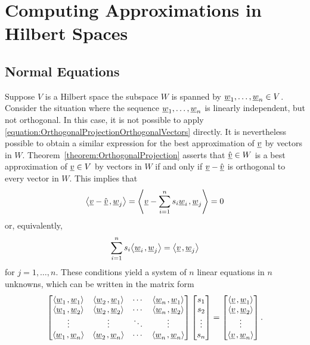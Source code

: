 \section{Computing Approximations in Hilbert Spaces}

\subsection{Normal Equations}

Suppose $V$ is a Hilbert space the subspace $W$ is spanned by $\underline{w}_1, \ldots, \underline{w}_n \in V$.
Consider the situation where the sequence $\underline{w}_1, \ldots, \underline{w}_n$ is linearly independent, but not orthogonal.
In this case, it is not possible to apply \eqref{equation:OrthogonalProjectionOrthogonalVectors} directly.
It is nevertheless possible to obtain a similar expression for the best approximation of $\underline{v}$ by vectors in $W$.
Theorem~\ref{theorem:OrthogonalProjection} asserts that $\hat{\underline{v}} \in W$ is a best approximation of $\underline{v} \in V$ by vectors in $W$ if and only if $\underline{v} - \hat{\underline{v}}$ is orthogonal to every vector in $W$.
This implies that
\begin{equation*}
{\left\langle  \underline{v} - \hat{\underline{v}}  \mskip2mu ,  \underline{w}_j  \right\rangle}
= {\left\langle  \underline{v} - \sum_{i=1}^n s_i \underline{w}_i  \mskip2mu ,  \underline{w}_j  \right\rangle}
= 0
\end{equation*}
or, equivalently,
\begin{equation*}
\sum_{i=1}^n s_i {\left\langle  \underline{w}_i  \mskip2mu ,  \underline{w}_j  \right\rangle}
= {\left\langle  \underline{v}  \mskip2mu ,  \underline{w}_j  \right\rangle}
\end{equation*}
for $j = 1, \ldots, n$.
These conditions yield a system of $n$ linear equations in $n$ unknowns, which can be written in the matrix form
\begin{equation*}
\begin{bmatrix}
{\left\langle  \underline{w}_1  \mskip2mu ,  \underline{w}_1  \right\rangle}
& {\left\langle  \underline{w}_2  \mskip2mu ,  \underline{w}_1  \right\rangle} & \cdots
& {\left\langle  \underline{w}_n  \mskip2mu ,  \underline{w}_1  \right\rangle} \\
{\left\langle  \underline{w}_1  \mskip2mu ,  \underline{w}_2  \right\rangle}
& {\left\langle  \underline{w}_2  \mskip2mu ,  \underline{w}_2  \right\rangle} & \cdots
& {\left\langle  \underline{w}_n  \mskip2mu ,  \underline{w}_2  \right\rangle} \\
\vdots & \vdots & \ddots & \vdots \\
{\left\langle  \underline{w}_1  \mskip2mu ,  \underline{w}_n  \right\rangle}
& {\left\langle  \underline{w}_2  \mskip2mu ,  \underline{w}_n  \right\rangle} & \cdots
& {\left\langle  \underline{w}_n  \mskip2mu ,  \underline{w}_n  \right\rangle}
\end{bmatrix}
\begin{bmatrix} s_1 \\ s_2 \\ \vdots \\ s_n \end{bmatrix}
= \begin{bmatrix} {\left\langle  \underline{v}  \mskip2mu ,  \underline{w}_1  \right\rangle} \\
{\left\langle  \underline{v}  \mskip2mu ,  \underline{w}_2  \right\rangle} \\ \vdots \\
{\left\langle  \underline{v}  \mskip2mu ,  \underline{w}_n  \right\rangle} \end{bmatrix} .
\end{equation*}
